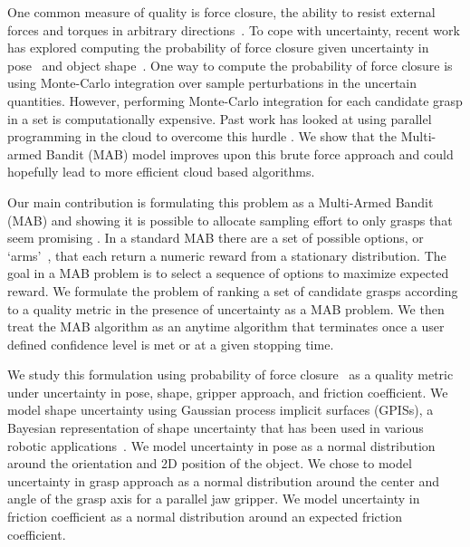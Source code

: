 \documentclass[10pt, conference]{ieeeconf}      %
\begin{document}
One common measure of quality is force closure, the ability to resist external forces and torques in arbitrary directions~\cite{li1988task}. To cope with uncertainty, recent work has explored computing the probability of  force closure given uncertainty in pose~\cite{christopoulos2007handling, kim2012physically, weisz2012pose} and object shape~\cite{kehoe2012estimating, mahler2015gp}.
One way to compute the probability of force closure is using Monte-Carlo integration over sample perturbations in the uncertain quantities\cite{christopoulos2007handling, kim2012physically, weisz2012pose, kehoe2012toward}. However, performing Monte-Carlo integration for each candidate grasp in a set is computationally expensive.  Past work has looked at using parallel programming in the cloud to overcome this hurdle \cite{kehoe2012estimating,kehoe2012toward,kehoe2015survey} . We show that the Multi-armed Bandit (MAB) model improves upon this brute force approach and could hopefully lead to more efficient cloud based algorithms. 

Our main contribution is formulating this problem as  a Multi-Armed Bandit (MAB) and showing it is possible to allocate sampling effort to only grasps that seem promising \cite{barto1998reinforcement, lai1985asymptotically, robbins1985some}. In a standard MAB there are a set of possible options, or `arms'~\cite{barto1998reinforcement}, that each return a numeric reward from a stationary distribution. The goal in a MAB problem is to  select a sequence of options to maximize expected reward. We formulate the problem of ranking a set of candidate grasps according to a quality metric in the presence of uncertainty as a MAB problem. We then treat the MAB algorithm as an anytime algorithm that terminates once a user defined confidence level is met or at a given stopping time. 

We study this formulation using probability of force closure~\cite{christopoulos2007handling, weisz2012pose, kehoe2012toward} as a quality metric under uncertainty in pose, shape, gripper approach, and friction coefficient. 
We model shape uncertainty using Gaussian process implicit surfaces (GPISs), a Bayesian representation of shape uncertainty that has been used in various robotic applications~\cite{dragiev2011, hollinger2013}. 
We model uncertainty in pose as a normal distribution around the orientation and 2D position of the object.
We chose to model uncertainty in grasp approach as a normal distribution around the center and angle of the grasp axis for a parallel jaw gripper. We model uncertainty in friction coefficient as a normal distribution around an expected friction coefficient.
\end{document}
